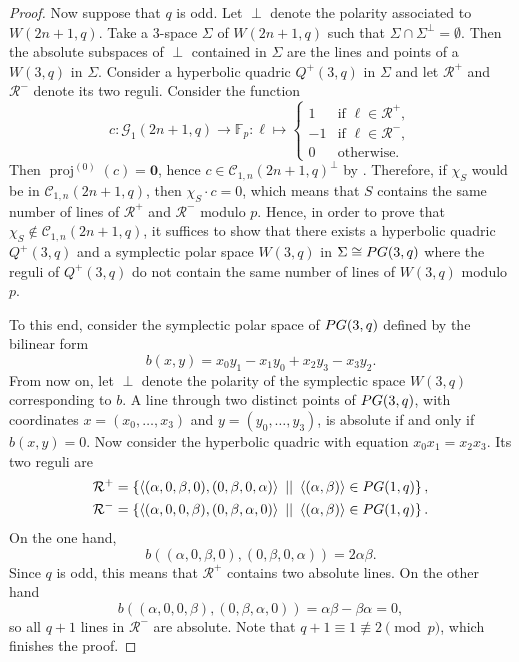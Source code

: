 \documentclass[10pt,a4paper]{amsart}
\newcommand{\FF}{\mathbb F}
\newcommand{\mc}{\mathcal C}
\newcommand{\mg}{\mathcal G}
\newcommand{\mr}{\mathcal R}
\newcommand{\pg}{\textnormal{PG}}
\DeclareMathOperator{\proj}{proj}
\newcommand{\sett}[2]{ \left\{ #1 \, \, || \, \, #2 \right \} }
\newcommand{\vspan}[1]{\left \langle #1 \right \rangle}
\newcommand{\zero}{\mathbf 0}
\begin{document}
\begin{proof}
 Now suppose that $q$ is odd.
 Let $\perp$ denote the polarity associated to $W(2n+1,q)$.
 Take a 3-space $\Sigma$ of $W(2n+1,q)$ such that $\Sigma \cap \Sigma^\perp = \emptyset$.
 Then the absolute subspaces of $\perp$ contained in $\Sigma$ are the lines and points of a $W(3,q)$ in $\Sigma$.
 Consider a hyperbolic quadric $Q^+(3,q)$ in $\Sigma$ and let $\mr^+$ and $\mr^-$ denote its two reguli.
 Consider the function
 \[
  c: \mg_1(2n+1,q) \to \FF_p: \ell \mapsto \begin{cases}
   1 & \text{if } \ell \in \mathcal R^+, \\
   -1 & \text{if } \ell \in \mathcal R^-, \\
   0 & \text{otherwise.}
  \end{cases}
 \]
 Then $\proj^{(0)}(c) = \zero$, hence $c \in \mc_{1,n}(2n+1,q)^\perp$ by .
 Therefore, if $\chi_S$ would be in $\mc_{1,n}(2n+1,q)$, then $\chi_S \cdot c = 0$, which means that $S$ contains the same number of lines of $\mathcal R^+$ and $\mathcal R^-$ modulo $p$.
 Hence, in order to prove that $\chi_S \notin \mc_{1,n}(2n+1,q)$, it suffices to show that there exists a hyperbolic quadric $Q^+(3,q)$ and a symplectic polar space $W(3,q)$ in $\Sigma \cong \pg(3,q)$ where the reguli of $Q^+(3,q)$ do not contain the same number of lines of $W(3,q)$ modulo $p$.
 
 To this end, consider the symplectic polar space of $\pg(3,q)$ defined by the bilinear form
 \[
  b(x,y) = x_0 y_1 - x_1 y_0 + x_2 y_3 - x_3 y_2.
 \]
 From now on, let $\perp$ denote the polarity of the symplectic space $W(3,q)$ corresponding to $b$.
 A line through two distinct points of $\pg(3,q)$, with coordinates $x=(x_0,\dots,x_3)$ and $y=(y_0,\dots,y_3)$, is absolute if and only if $b(x,y) = 0$.
 Now consider the hyperbolic quadric with equation $x_0 x_1 = x_2 x_3$.
 Its two reguli are
 \begin{align*}
  \mathcal R^+ &= \sett{\vspan{(\alpha,0,\beta,0), (0,\beta,0,\alpha)}}{ \vspan{(\alpha,\beta)} \in \pg(1,q)}, \\
  \mathcal R^- &= \sett{\vspan{(\alpha,0,0,\beta), (0,\beta,\alpha,0)}}{\vspan{(\alpha,\beta)} \in \pg(1,q)}.
 \end{align*}
 On the one hand,
 \[
  b\left((\alpha,0,\beta,0),(0,\beta,0,\alpha)\right)
  = 2 \alpha \beta.
 \]
 Since $q$ is odd, this means that $\mathcal R^+$ contains two absolute lines.
 On the other hand
 \[
  b\left((\alpha,0,0,\beta),(0,\beta,\alpha,0)\right) = \alpha \beta - \beta \alpha=0,
 \]
 so all $q+1$ lines in $\mathcal R^-$ are absolute.
 Note that $q+1 \equiv 1 \not \equiv 2 \pmod p$, which finishes the proof.
\end{proof}
\end{document}
